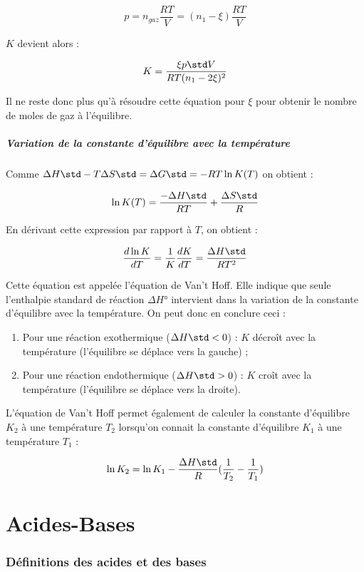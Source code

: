 $$p = n_{gaz}\frac{RT}{V} = (n_1-\xi)\frac{RT}{V}$$

$K$ devient alors :

$$K = \frac{\xi p\std V}{RT(n_1-2\xi)^2}$$

Il ne reste donc plus qu'à résoudre cette équation pour $\xi$ pour obtenir
le nombre de moles de gaz à l'équilibre.

\subsubsection{Variation de la constante d'équilibre avec la température}
Comme $\Delta H\std-T\Delta S\std = \Delta G\std = -RT\ln K(T)$ on obtient :

$$\ln K(T) = \frac{-\Delta H\std}{RT} + \frac{\Delta S\std}{R}$$

En dérivant cette expression par rapport à $T$, on obtient :

$$\frac{d \ln K}{dT} = \frac{1}{K} \frac{dK}{dT} = \frac{\Delta H\std}{RT^2}$$

Cette équation est appelée l'équation de Van't Hoff. Elle indique que
seule l'enthalpie standard de réaction $\Delta H°$ intervient dans la 
variation de la constante d'équilibre avec la température. On peut
donc en conclure ceci :

\begin{enumerate}
	\item Pour une réaction exothermique ($\Delta H\std < 0$) : $K$ 
	décroît avec la température (l'équilibre se déplace vers la gauche) ;
	\item Pour une réaction endothermique ($\Delta H\std > 0$) : $K$
	croît avec la température (l'équilibre se déplace vers la droite).
\end{enumerate}

L'équation de Van't Hoff permet également de calculer la constante 
d'équilibre $K_2$ à une température $T_2$ lorsqu'on connait la
constante d'équilibre $K_1$ à une température $T_1$ :

$$\ln K_2 = \ln K_1 - \frac{\Delta H\std}{R} (\frac{1}{T_2} - \frac{1}{T_1})$$

\part{Acides-Bases}
\section{Définitions des acides et des bases}

